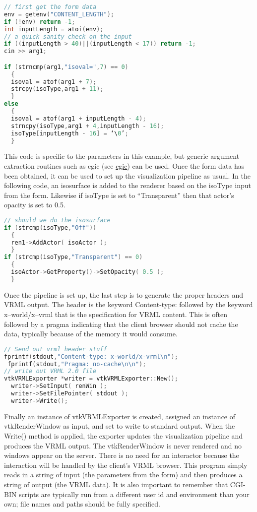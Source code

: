 \begin{lstlisting}[language=C++, caption={}, numbers=none, frame=none]
// first get the form data
env = getenv("CONTENT_LENGTH");
if (!env) return -1;
int inputLength = atoi(env);
// a quick sanity check on the input
if ((inputLength > 40)||(inputLength < 17)) return -1;
cin >> arg1;

if (strncmp(arg1,"isoval=",7) == 0)
  {
  isoval = atof(arg1 + 7);
  strcpy(isoType,arg1 + 11);
  }
else
  {
  isoval = atof(arg1 + inputLength - 4);
  strncpy(isoType,arg1 + 4,inputLength - 16);
  isoType[inputLength - 16] = ‘\0’;
  }
\end{lstlisting}

This code is specific to the parameters in this example, but generic argument extraction routines such as cgic (see \href{https://boutell.com/cgic/}{cgic}) can be used. Once the form data has been obtained, it can be used to set up the visualization pipeline as usual. In the following code, an isosurface is added to the renderer based on the isoType input from the form. Likewise if isoType is set to ``Transparent'' then that actor’s opacity is set to 0.5.

\begin{lstlisting}[language=C++, caption={}, numbers=none, frame=none]
// should we do the isosurface
if (strcmp(isoType,"Off"))
  {
  ren1->AddActor( isoActor );
  }
if (strcmp(isoType,"Transparent") == 0)
  {
  isoActor->GetProperty()->SetOpacity( 0.5 );
  }
\end{lstlisting}

Once the pipeline is set up, the last step is to generate the proper headers and VRML output. The header is the keyword Content-type: followed by the keyword x--world/x--vrml that is the specification for VRML content. This is often followed by a pragma indicating that the client browser should not cache the data, typically because of the memory it would consume.

\begin{lstlisting}[language=C++, caption={}, numbers=none, frame=none]
// Send out vrml header stuff
fprintf(stdout,"Content-type: x-world/x-vrml\n");
 fprintf(stdout,"Pragma: no-cache\n\n");
// write out VRML 2.0 file
vtkVRMLExporter *writer = vtkVRMLExporter::New();
  writer->SetInput( renWin );
  writer->SetFilePointer( stdout );
  writer->Write();
\end{lstlisting}

Finally an instance of vtkVRMLExporter is created, assigned an instance of vtkRenderWindow as input, and set to write to standard output. When the Write() method is applied, the exporter updates the visualization pipeline and produces the VRML output. The vtkRenderWindow is never rendered and no windows appear on the server. There is no need for an interactor because the interaction will be handled by the client’s VRML browser. This program simply reads in a string of input (the parameters from the form) and then produces a string of output (the VRML data). It is also important to remember that CGI-BIN scripts are typically run from a different user id and environment than your own; file names and paths should be fully specified.


